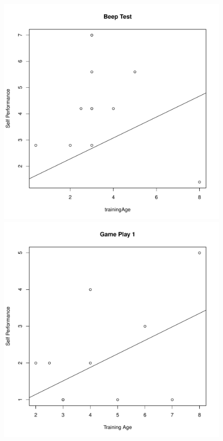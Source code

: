 \begin{CJK}{UTF8}{gbsn}
\begin{figure}[htbp]
  \centering
\includegraphics[scale=.2]{images/indPerfBeepTrainingAge.pdf}
\includegraphics[scale=.2]{images/indPerf0109TrainingAge.pdf}

\end{figure}
\end{CJK}
